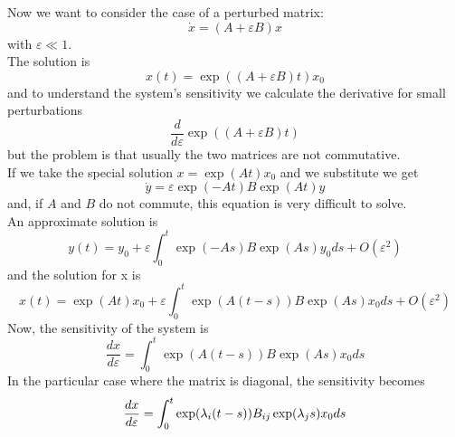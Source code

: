 Now we want to consider the case of a perturbed matrix:
$$
	\dot{x} = (A+\varepsilon B)x
$$
with $\varepsilon \ll 1$. \\
The solution is
$$
	x(t) = \exp((A+\varepsilon B) t)x_0
$$
and to understand the system's sensitivity we calculate the derivative for small perturbations
$$
	\frac{d}{d\varepsilon}\exp((A+\varepsilon B)t)
$$
but the problem is that usually the two matrices are not commutative. \\
If we take the special solution $x = \exp(At)x_0$ and we substitute we get
$$
	\dot{y} = \varepsilon\exp(-At)B\exp(At)y
$$
and, if $A$ and $B$ do not commute, this equation is very difficult to solve. \\
An approximate solution is
$$
	y(t) = y_0 + \varepsilon\int_0^t \exp(-As)B\exp(As)y_0ds + O(\varepsilon^2)
$$
and the solution for x is
$$
	x(t) = \exp(At)x_0 + \varepsilon\int_0^t \exp(A(t-s))B\exp(As)x_0ds + O(\varepsilon^2)
$$
Now, the sensitivity of the system is
$$
	\frac{dx}{d\varepsilon} = \int_0^t \exp(A(t-s))B\exp(As)x_0ds 
$$
In the particular case where the matrix is diagonal, the sensitivity becomes
$$
	\frac{dx}{d\varepsilon} = \int_0^t \exp(\lambda_i(t-s))B_{ij}\exp(\lambda_js)x_0ds 
$$
